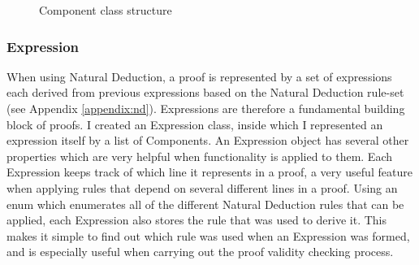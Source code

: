 \begin{figure}[!ht]
	\centering
	\caption{Component class structure}
\end{figure}

\subsubsection{Expression}

When using Natural Deduction, a proof is represented by a set of expressions each derived from previous expressions based on the Natural Deduction rule-set (see Appendix \ref{appendix:nd}). Expressions are therefore a fundamental building block of proofs. I created an Expression class, inside which I represented an expression itself by a list of Components. An Expression object has several other properties which are very helpful when functionality is applied to them. Each Expression keeps track of which line it represents in a proof, a very useful feature when applying rules that depend on several different lines in a proof. Using an enum which enumerates all of the different Natural Deduction rules that can be applied, each Expression also stores the rule that was used to derive it. This makes it simple to find out which rule was used when an Expression was formed, and is especially useful when carrying out the proof validity checking process.


